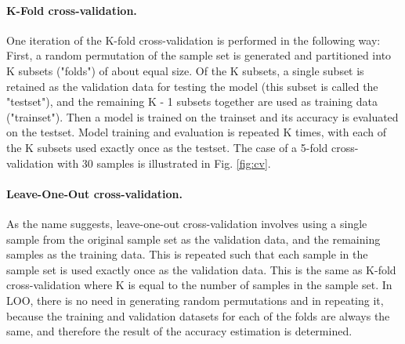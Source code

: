 \paragraph{K-Fold cross-validation.}
One iteration of the K-fold cross-validation is performed in the following way: First, a random permutation of the sample set is generated and partitioned into K subsets ("folds") of about equal size. Of the K subsets, a single subset is retained as the validation data for testing the model (this subset is called the "testset"), and the remaining K - 1 subsets together are used as training data ("trainset"). Then a model is trained on the trainset and its accuracy is evaluated on the testset. Model training and evaluation is repeated K times, with each of the K subsets used exactly once as the testset.
The case of a 5-fold cross-validation with 30 samples is illustrated in Fig. \ref{fig:cv}.

\paragraph{Leave-One-Out cross-validation.}
As the name suggests, leave-one-out cross-validation involves using a single sample from the original sample set as the validation data, and the remaining samples as the training data. This is repeated such that each sample in the sample set is used exactly once as the validation data. This is the same as K-fold cross-validation where K is equal to the number of samples in the sample set.
In LOO, there is no need in generating random permutations and in repeating it, because the training and validation datasets for each of the folds are always the same, and therefore the result of the accuracy estimation is determined.

